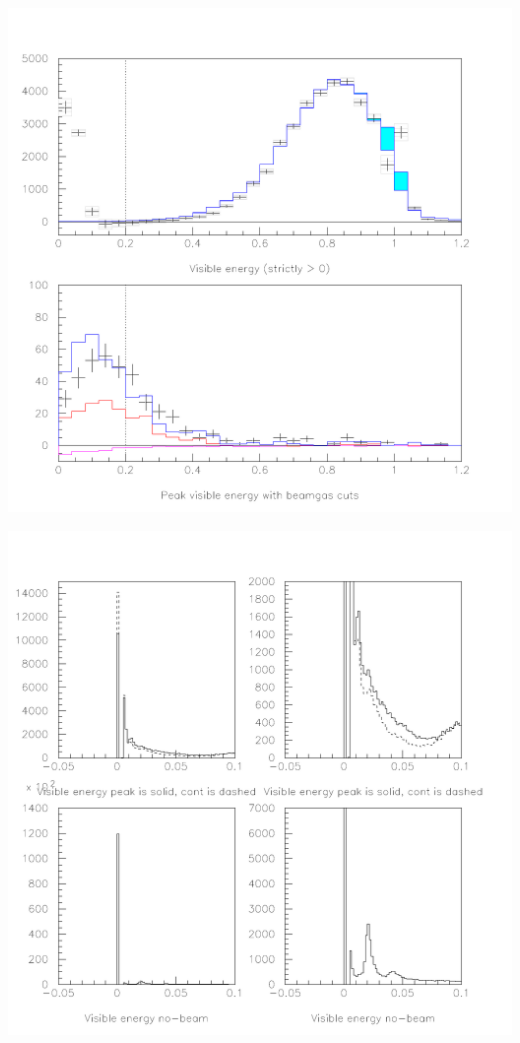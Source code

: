 \documentclass[landscape]{article}
\begin{document}
\Large
\renewcommand{\labelitemi}{-}
\setlength{\parindent}{0 cm}

\begin{center}
  \includegraphics[height=\textheight]{tr2_bgvisen.pdf}
\end{center}

\begin{center}
  \includegraphics[height=\textheight]{tr2_visen_netherregions.pdf}
\end{center}
\end{document}
